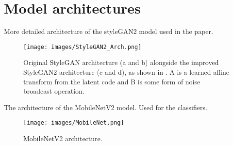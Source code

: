 \section{Model architectures}

More detailed architecture of the styleGAN2 model used in the paper.

\begin{figure}[H]
    \centering
    \texttt{[image: images/StyleGAN2\_Arch.png]}
    \caption{Original StyleGAN architecture (a and b) alongside the improved StyleGAN2 architecture (c and d), as shown in \cite{karras2020analyzing}. A is a learned affine transform from the latent code and B is some form of noise broadcast operation.}
    \label{fig:StyleGAN2}
\end{figure}

The architecture of the MobileNetV2 model. Used for the classifiers.
\begin{figure}[H]
    \centering
    \texttt{[image: images/MobileNet.png]}
    \caption{MobileNetV2 architecture.}
    \label{fig:MobileV2}
\end{figure}


